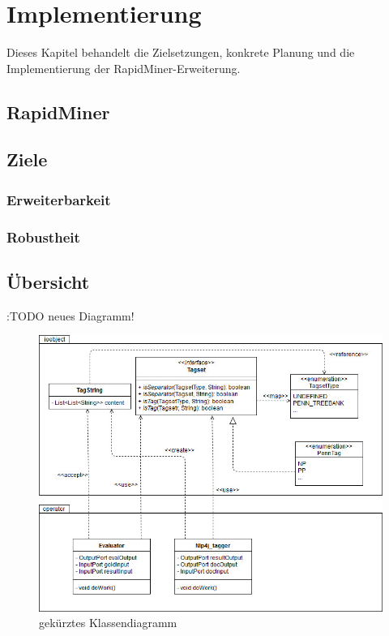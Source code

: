 %
\chapter{Implementierung}
\label{sec:impl}

Dieses Kapitel behandelt die Zielsetzungen, konkrete Planung und die Implementierung der RapidMiner-Erweiterung.

\section{RapidMiner}

\section{Ziele}
\subsection{Erweiterbarkeit}
\subsection{Robustheit}


\section{Übersicht}
\label{sec:impl:structure}

:TODO neues Diagramm! 
\begin{figure}[htb]
	\includegraphics[width=\textwidth]{gfx/UML_Overview_simple.jpg}
	\caption{gekürztes Klassendiagramm}
	\label{fig:impl:structure:overview:uml}
\end{figure}

